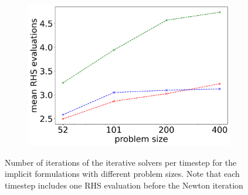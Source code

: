 \begin{figure}[H]
\begin{subfigure}[b]{0.32\textwidth}
	\end{subfigure}
	\begin{subfigure}[b]{0.32\textwidth}
		\centering
		\includegraphics[width=1\textwidth]{images/TANDEM_averageNumberRHSEvaluations.png}
	\end{subfigure}
	\caption{Number of iterations of the iterative solvers per timestep for the implicit formulations with different problem sizes. Note that each timestep includes one RHS evaluation before the Newton iteration}
	\label{fig:implicit_methods_scalabilty_iterations}
\end{figure}

